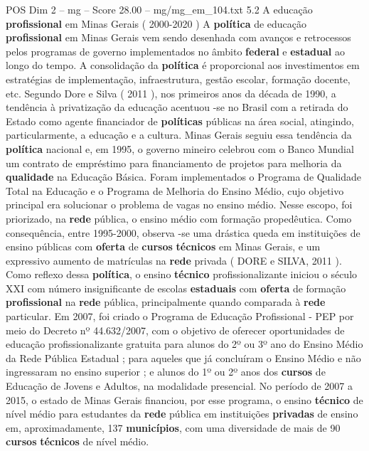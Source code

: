 \begin{textsample}{POS Dim 2 – mg – Score 28.00 – mg/mg\_em\_104.txt}  \label{ex:f2_pos_192}
5.2 A educação \textbf{profissional} em Minas Gerais ( 2000-2020 ) A \textbf{política} de educação \textbf{profissional} em Minas Gerais vem sendo desenhada com avanços e retrocessos pelos programas de governo implementados no âmbito \textbf{federal} e \textbf{estadual} ao longo do tempo.
A consolidação da \textbf{política} é proporcional aos investimentos em estratégias de implementação, infraestrutura, gestão escolar, formação docente, etc.
Segundo Dore e Silva ( 2011 ), nos primeiros anos da década de 1990, a tendência à privatização da educação acentuou -se no Brasil com a retirada do Estado como agente financiador de \textbf{políticas} públicas na área social, atingindo, particularmente, a educação e a cultura.
Minas Gerais seguiu essa tendência da \textbf{política} nacional e, em 1995, o governo mineiro celebrou com o Banco Mundial um contrato de empréstimo para financiamento de projetos para melhoria da \textbf{qualidade} na Educação Básica.
Foram implementados o Programa de Qualidade Total na Educação e o Programa de Melhoria do Ensino Médio, cujo objetivo principal era solucionar o problema de vagas no ensino médio.
Nesse escopo, foi priorizado, na \textbf{rede} pública, o ensino médio com formação propedêutica.
Como consequência, entre 1995-2000, observa -se uma drástica queda em instituições de ensino públicas com \textbf{oferta} de \textbf{cursos} \textbf{técnicos} em Minas Gerais, e um expressivo aumento de matrículas na \textbf{rede} privada ( DORE e SILVA, 2011 ).
Como reflexo dessa \textbf{política}, o ensino \textbf{técnico} profissionalizante iniciou o século XXI com número insignificante de escolas \textbf{estaduais} com \textbf{oferta} de formação \textbf{profissional} na \textbf{rede} pública, principalmente quando comparada à \textbf{rede} particular.
Em 2007, foi criado o Programa de Educação Profissional - PEP por meio do Decreto nº 44.632/2007, com o objetivo de oferecer oportunidades de educação profissionalizante gratuita para alunos do 2º ou 3º ano do Ensino Médio da Rede Pública Estadual ; para aqueles que já concluíram o Ensino Médio e não ingressaram no ensino superior ; e alunos do 1º ou 2º anos dos \textbf{cursos} de Educação de Jovens e Adultos, na modalidade presencial.
No período de 2007 a 2015, o estado de Minas Gerais financiou, por esse programa, o ensino \textbf{técnico} de nível médio para estudantes da \textbf{rede} pública em instituições \textbf{privadas} de ensino em, aproximadamente, 137 \textbf{municípios}, com uma diversidade de mais de 90 \textbf{cursos} \textbf{técnicos} de nível médio.

\end{textsample}
